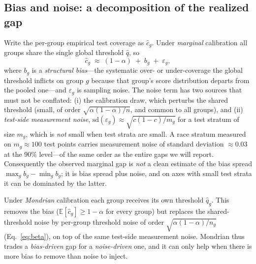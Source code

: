 \documentclass[review,12pt]{elsarticle}
\begin{document}
\subsection{Bias and noise: a decomposition of the realized gap}
\label{sec:decomp}
Write the per-group empirical test coverage as $\hat c_g$. Under \emph{marginal} calibration all groups share the single global threshold $\hat q$, so
\begin{equation}
\hat c_g \;\approx\; (1-\alpha) \;+\; b_g \;+\; \varepsilon_g ,
\end{equation}
where $b_g$ is a \emph{structural bias}---the systematic over- or under-coverage the global threshold inflicts on group $g$ because that group's score distribution departs from the pooled one---and $\varepsilon_g$ is sampling noise. The noise term has two sources that must not be conflated: (i) the calibration draw, which perturbs the shared threshold (small, of order $\sqrt{\alpha(1-\alpha)/n}$, and common to all groups), and (ii) \emph{test-side measurement noise}, $\mathrm{sd}(\varepsilon_g) \approx \sqrt{c(1-c)/m_g}$ for a test stratum of size $m_g$, which is \emph{not} small when test strata are small. A race stratum measured on $m_g \approx 100$ test points carries measurement noise of standard deviation $\approx 0.03$ at the $90\%$ level---of the same order as the entire gaps we will report. Consequently the observed marginal gap is \emph{not} a clean estimate of the bias spread $\max_g b_g - \min_g b_g$; it is bias spread plus noise, and on axes with small test strata it can be dominated by the latter.

Under \emph{Mondrian} calibration each group receives its own threshold $\hat q_g$. This removes the bias ($\mathbb{E}[\hat c_g] \ge 1-\alpha$ for every group) but replaces the shared-threshold noise by per-group threshold noise of order $\sqrt{\alpha(1-\alpha)/n_g}$ (Eq.~\eqref{eq:beta}), on top of the same test-side measurement noise. Mondrian thus trades a \emph{bias-driven} gap for a \emph{noise-driven} one, and it can only help when there is more bias to remove than noise to inject.
\end{document}

